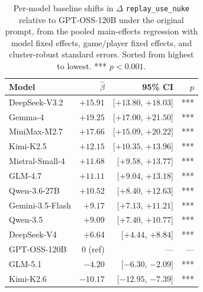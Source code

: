 \begin{table}[h]
\centering
\small
\begin{tabular}{lrrr}
\toprule
Model & $\hat\beta$ & 95\% CI & $p$ \\
\midrule
DeepSeek-V3.2     & $+15.91$ & [$+13.80$, $+18.03$] & ***  \\
Gemma-4           & $+19.25$ & [$+17.00$, $+21.50$] & ***  \\
MiniMax-M2.7      & $+17.66$ & [$+15.09$, $+20.22$] & ***  \\
Kimi-K2.5         & $+12.15$ & [$+10.35$, $+13.96$] & ***  \\
Mistral-Small-4   & $+11.68$ & [$+9.58$, $+13.77$]  & ***  \\
GLM-4.7           & $+11.11$ & [$+9.04$, $+13.18$]  & ***  \\
Qwen-3.6-27B      & $+10.52$ & [$+8.40$, $+12.63$]  & ***  \\
Gemini-3.5-Flash  & $+9.17$  & [$+7.13$, $+11.21$]  & ***  \\
Qwen-3.5          & $+9.09$  & [$+7.40$, $+10.77$]  & ***  \\
DeepSeek-V4       & $+6.64$  & [$+4.44$, $+8.84$]   & ***  \\
GPT-OSS-120B      & 0 (ref)  & ---                  & ---  \\
GLM-5.1           & $-4.20$  & [$-6.30$, $-2.09$]   & ***  \\
Kimi-K2.6         & $-10.17$ & [$-12.95$, $-7.39$]  & ***  \\
\bottomrule
\end{tabular}
\caption{Per-model baseline shifts in $\Delta$ \texttt{replay\_use\_nuke} relative to GPT-OSS-120B under the original prompt, from the pooled main-effects regression with model fixed effects, game/player fixed effects, and cluster-robust standard errors. Sorted from highest to lowest. *** $p<0.001$.}
\label{tab:app-per-model-baselines}
\end{table}

\clearpage
